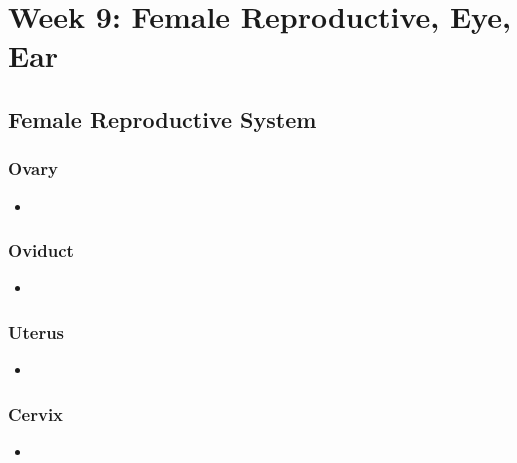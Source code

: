 \chapter{Week 9: Female Reproductive, Eye, Ear}

\section{Female Reproductive System}

\subsection{Ovary}
\begin{center}
\end{center}
\begin{itemize}
  \item 
\end{itemize}

\subsection{Oviduct}
\begin{center}
\end{center}
\begin{itemize}
  \item 
\end{itemize}

\subsection{Uterus}
\begin{center}
\end{center}
\begin{itemize}
  \item 
\end{itemize}

\subsection{Cervix}
\begin{center}
\end{center}
\begin{itemize}
  \item 
\end{itemize}



